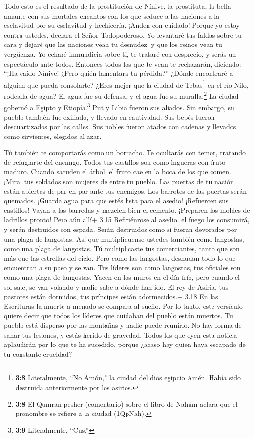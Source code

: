  Todo esto es el resultado de la prostitución de Nínive, la
prostituta, la bella amante con sus mortales encantos con los que seduce
a las naciones a la esclavitud por su esclavitud y hechicería.
 ¡Anden con cuidado! Porque yo estoy contra ustedes, declara
el Señor Todopoderoso. Yo levantaré tus faldas sobre tu cara y dejaré
que las naciones vean tu desnudez, y que los reinos vean tu vergüenza.
 Yo echaré inmundicia sobre ti, te trataré con desprecio, y
serás un espectáculo ante todos.  Entonces todos los que te
vean te rechazarán, diciendo: ``¡Ha caído Nínive! ¿Pero quién lamentará
tu pérdida?'' ¿Dónde encontraré a alguien que pueda consolarte?
 ¿Eres mejor que la ciudad de Tebas\footnote{\textbf{3:8}
  Literalmente, ``No Amón,'' la ciudad del dios egipcio Amén. Había sido
  destruida anteriormente por los asirios.} en el río Nilo, rodeada de
agua? El agua fue su defensa, y el agua fue su muralla,\footnote{\textbf{3:8}
  El Qumran pesher (comentario) sobre el libro de Nahúm aclara que el
  pronombre se refiere a la ciudad (1QpNah).}  La ciudad
gobernó a Egipto y Etiopía.\footnote{\textbf{3:9} Literalmente, ``Cus.''}
Put y Libia fueron sus aliados.  Sin embargo, su pueblo
también fue exiliado, y llevado en cautividad. Sus bebés fueron
descuartizados por las calles. Sus nobles fueron atados con cadenas y
llevados como sirvientes, elegidos al azar.

 Tú también te comportarás como un borracho. Te ocultarás
con temor, tratando de refugiarte del enemigo.  Todos tus
castillos son como higueras con fruto maduro. Cuando sacuden el árbol,
el fruto cae en la boca de los que comen.  ¡Mira! tus
soldados son mujeres de entre tu pueblo. Las puertas de tu nación están
abiertas de par en par ante tus enemigos. Los barrotes de las puertas
serán quemados.  ¡Guarda agua para que estés lista para el
asedio! ¡Refuercen sus castillos! Vayan a las barredas y mezclen bien el
cemento. ¡Preparen los moldes de ladrillos pronto!  Pero
aún allí+ 3.15 Refiriénrose al asedio. el fuego los consumirá, y serán
destruidos con espada. Serán destruidos como si fueran devorados por una
plaga de langostas. Así que multiplíquense ustedes también como
langostas, como una plaga de langostas.  Tú multiplicaste
tus comerciantes, tanto que son más que las estrellas del cielo. Pero
como las langostas, desnudan todo lo que encuentran a su paso y se van.
 Tus líderes son como langostas, tus oficiales son como una
plaga de langostas. Yacen en los muros en el día frío, pero cuando el
sol sale, se van volando y nadie sabe a dónde han ido.  El
rey de Asiria, tus pastores están dormidos, tus príncipes están
adormecidos.+ 3.18 En las Escrituras la muerte a menudo se compara al
sueño. Por lo tanto, este versículo quiere decir que todos los líderes
que cuidaban del pueblo están muertos. Tu pueblo está disperso por las
montañas y nadie puede reunirlo.  No hay forma de sanar tus
lesiones, y estás herido de gravedad. Todos los que oyen esta noticia
aplaudirán por lo que te ha sucedido, porque ¿acaso hay quien haya
escapado de tu constante crueldad?

